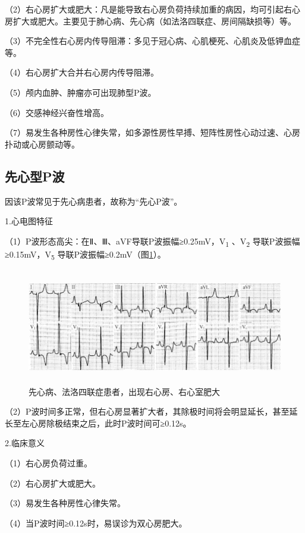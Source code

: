 （2）右心房扩大或肥大：凡是能导致右心房负荷持续加重的病因，均可引起右心房扩大或肥大。主要见于肺心病、先心病（如法洛四联症、房间隔缺损等）等。

（3）不完全性右心房内传导阻滞：多见于冠心病、心肌梗死、心肌炎及低钾血症等。

（4）右心房扩大合并右心房内传导阻滞。

（5）颅内血肿、肿瘤亦可出现肺型P波。

（6）交感神经兴奋性增高。

（7）易发生各种房性心律失常，如多源性房性早搏、短阵性房性心动过速、心房扑动或心房颤动等。

\protect\hypertarget{text00007.htmlux5cux23subid6}{}{}

\subsection{先心型P波}

因该P波常见于先心病患者，故称为“先心P波”。

1.心电图特征

（1）P波形态高尖：在Ⅱ、Ⅲ、aVF导联P波振幅≥0.25mV，V\textsubscript{1}
、V\textsubscript{2} 导联P波振幅≥0.15mV，V\textsubscript{5}
导联P波振幅≥0.2mV（图\ref{fig1-4}）。

\begin{figure}[!htbp]
 \centering
 \includegraphics[width=5.78125in,height=1.97917in]{./images/Image00009.jpg}
 \captionsetup{justification=centering}
 \caption{先心病、法洛四联症患者，出现右心房、右心室肥大}
 \label{fig1-4}
  \end{figure} 

（2）P波时间多正常，但右心房显著扩大者，其除极时间将会明显延长，甚至延长至左心房除极结束之后，此时P波时间可≥0.12s。

2.临床意义

（1）右心房负荷过重。

（2）右心房扩大或肥大。

（3）易发生各种房性心律失常。

（4）当P波时间≥0.12s时，易误诊为双心房肥大。

